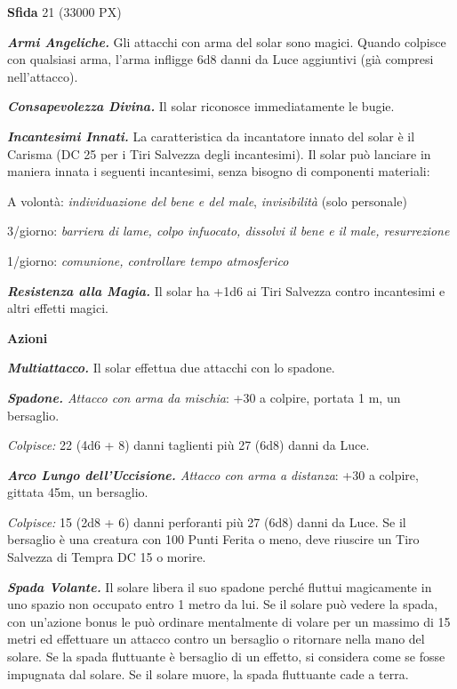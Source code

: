 \begin{multicols}{2}
	\textbf{Sfida} 21 (33000 PX)

	\textit{\textbf{Armi Angeliche.}} Gli attacchi con arma del solar sono magici. Quando colpisce con qualsiasi arma, l'arma infligge 6d8 danni da Luce aggiuntivi (già compresi nell'attacco).

	\textit{\textbf{Consapevolezza Divina.}} Il solar riconosce immediatamente le bugie.

	\textit{\textbf{Incantesimi Innati.}} La caratteristica da incantatore innato del solar è il Carisma (DC 25 per i Tiri Salvezza degli incantesimi). Il solar può lanciare in maniera innata i seguenti incantesimi, senza bisogno di componenti materiali:

	A volontà: \textit{individuazione del bene e del male}, \textit{invisibilità} (solo personale)

	3/giorno: \textit{barriera di lame, colpo infuocato, dissolvi il bene e il male, resurrezione}

	1/giorno: \textit{comunione, controllare tempo atmosferico}

	\textit{\textbf{Resistenza alla Magia.}} Il solar ha +1d6 ai Tiri Salvezza contro incantesimi e altri effetti magici.

	\textbf{Azioni}

	\textit{\textbf{Multiattacco.}} Il solar effettua due attacchi con lo spadone.

	\textit{\textbf{Spadone.} Attacco con arma da mischia}: +30 a colpire, portata 1 m, un bersaglio.

	\textit{Colpisce:} 22 (4d6 + 8) danni taglienti più 27 (6d8) danni da Luce.

	\textit{\textbf{Arco Lungo dell'Uccisione.} Attacco con arma a distanza}: +30 a colpire, gittata 45m, un bersaglio.

	\textit{Colpisce:} 15 (2d8 + 6) danni perforanti più 27 (6d8) danni da Luce. Se il bersaglio è una creatura con 100 Punti Ferita o meno, deve riuscire un Tiro Salvezza di Tempra DC 15 o morire.

	\textit{\textbf{Spada Volante.}} Il solare libera il suo spadone perché fluttui magicamente in uno spazio non occupato entro 1 metro da lui. Se il solare può vedere la spada, con un'azione bonus le può ordinare mentalmente di volare per un massimo di 15 metri ed effettuare un attacco contro un bersaglio o ritornare nella mano del solare. Se la spada fluttuante è bersaglio di un effetto, si considera come se fosse impugnata dal solare. Se il solare muore, la spada fluttuante cade a terra.


\end{multicols}
